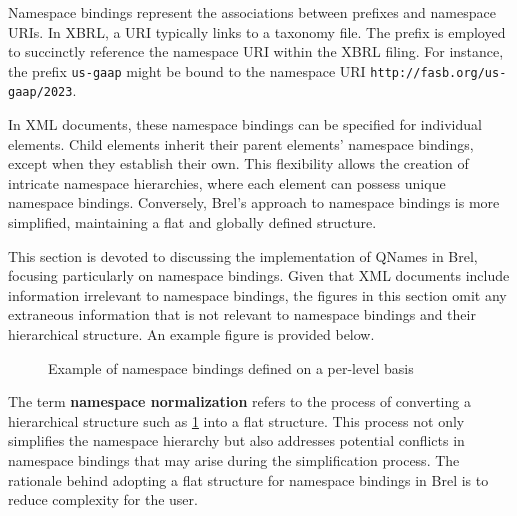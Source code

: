 Namespace bindings represent the associations between prefixes and namespace URIs.
In XBRL, a URI typically links to a taxonomy file.
The prefix is employed to succinctly reference the namespace URI within the XBRL filing.
For instance, the prefix \texttt{us-gaap} might be bound to the namespace URI \texttt{http://fasb.org/us-gaap/2023}.

In XML documents, these namespace bindings can be specified for individual elements.
Child elements inherit their parent elements' namespace bindings, except when they establish their own.
This flexibility allows the creation of intricate namespace hierarchies, where each element can possess unique namespace bindings.
Conversely, Brel's approach to namespace bindings is more simplified, maintaining a flat and globally defined structure.

This section is devoted to discussing the implementation of QNames in Brel, focusing particularly on namespace bindings.
Given that XML documents include information irrelevant to namespace bindings,
the figures in this section omit any extraneous information that is not relevant to namespace bindings and their hierarchical structure.
An example figure is provided below.

\begin{figure}[H]
    \caption{Example of namespace bindings defined on a per-level basis}
    \label{fig:custom_namespace_notation_example}
\end{figure}

The term \textbf{namespace normalization} refers to the process of converting a hierarchical structure such as \ref{fig:custom_namespace_notation_example} into a flat structure.
This process not only simplifies the namespace hierarchy but also addresses potential conflicts in namespace bindings that may arise during the simplification process.
The rationale behind adopting a flat structure for namespace bindings in Brel is to reduce complexity for the user.

